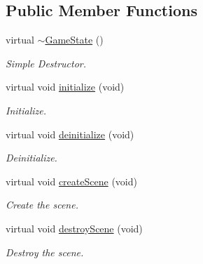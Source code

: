 \subsection*{Public Member Functions}
\begin{DoxyCompactItemize}
\item 
\mbox{\label{class_common_1_1_game_state_a481604dc59d2ced7a30f8c04421888e2}} 
virtual \hyperlink{class_common_1_1_game_state_a481604dc59d2ced7a30f8c04421888e2}{$\sim$\+Game\+State} ()
\begin{DoxyCompactList}\small\item\em Simple Destructor. \end{DoxyCompactList}\item 
\mbox{\label{class_common_1_1_game_state_a4e7fa2fbc9080111213ce379eb33d082}} 
virtual void \hyperlink{class_common_1_1_game_state_a4e7fa2fbc9080111213ce379eb33d082}{initialize} (void)
\begin{DoxyCompactList}\small\item\em Initialize. \end{DoxyCompactList}\item 
\mbox{\label{class_common_1_1_game_state_a7cda78fa6c4a405ead90c6e0bc895c85}} 
virtual void \hyperlink{class_common_1_1_game_state_a7cda78fa6c4a405ead90c6e0bc895c85}{deinitialize} (void)
\begin{DoxyCompactList}\small\item\em Deinitialize. \end{DoxyCompactList}\item 
\mbox{\label{class_common_1_1_game_state_a30b77d03dd849ebb2d6698686e9e7619}} 
virtual void \hyperlink{class_common_1_1_game_state_a30b77d03dd849ebb2d6698686e9e7619}{create\+Scene} (void)
\begin{DoxyCompactList}\small\item\em Create the scene. \end{DoxyCompactList}\item 
\mbox{\label{class_common_1_1_game_state_a03176055b9cb064b2cea5b64cbf6647a}} 
virtual void \hyperlink{class_common_1_1_game_state_a03176055b9cb064b2cea5b64cbf6647a}{destroy\+Scene} (void)
\begin{DoxyCompactList}\small\item\em Destroy the scene. \end{DoxyCompactList}\item 

\end{DoxyCompactItemize}
